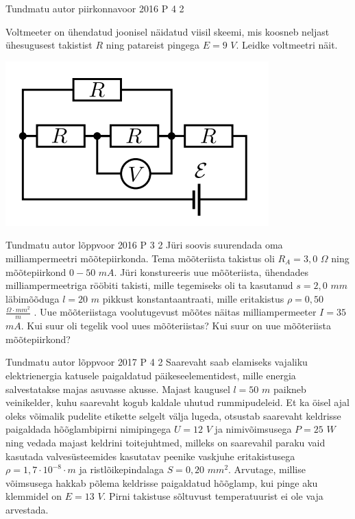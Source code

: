 \documentclass[11pt]{article}
\begin{document}
{%
{Tundmatu autor} %
{piirkonnavoor} %
{2016} %
{P 4} %
{2} %
{
\ifStatement
Voltmeeter on ühendatud joonisel näidatud viisil skeemi, mis koosneb neljast ühesugusest takistist $R$ ning patareist pingega $E = 9$ $V$. Leidke voltmeetri näit.
\begin{center}
	\includegraphics[width=0.5\linewidth]{2016-v2p-04-yl.png}
\end{center}
\fi
}


{Tundmatu autor} %
{lõppvoor} %
{2016} %
{P 3} %
{2} %
{
\ifStatement
Jüri soovis suurendada oma milliampermeetri mõõtepiirkonda. Tema mõõteriista takistus oli $R_A = 3,0$ $\Omega$ ning mõõtepiirkond $0 - 50$ $mA$. Jüri konstureeris uue mõõteriista, ühendades milliampermeetriga rööbiti takisti, mille tegemiseks oli ta kasutanud $s = 2,0$ $mm$ läbimõõduga $l = 20$ $m$ pikkust konstantaantraati, mille eritakistus $\rho = 0,50$ $\frac{\Omega \cdot mm^2}{m}$ . Uue mõõteriistaga voolutugevust mõõtes näitas milliampermeeter $I = 35$ $mA$. Kui suur oli tegelik vool uues mõõteriistas? Kui suur on uue mõõteriista mõõtepiirkond?
\fi
}

{Tundmatu autor} %
{lõppvoor} %
{2017} %
{P 4} %
{2} %
{
\ifStatement
Saarevaht saab elamiseks vajaliku elektrienergia katusele paigaldatud päikeseelementidest, mille energia salvestatakse majas asuvasse akusse. Majast kaugusel $l = 50$ $m$ paikneb veinikelder, kuhu saarevaht kogub kaldale uhutud rummipudeleid. Et ka öisel ajal oleks võimalik pudelite etikette selgelt välja lugeda, otsustab saarevaht keldrisse paigaldada hõõglambipirni nimipingega $U = 12$ $V$ ja nimivõimsusega $P = 25$ $W$ ning vedada majast keldrini toitejuhtmed, milleks on saarevahil paraku vaid kasutada valvesüsteemides kasutatav peenike vaskjuhe eritakistusega $\rho = 1,7 \cdot 10^{-8} \cdot m$ ja ristlõikepindalaga $S = 0,20$ $mm^2$. Arvutage, millise võimsusega hakkab põlema keldrisse paigaldatud hõõglamp, kui pinge aku klemmidel on $E = 13$ $V$. Pirni takistuse sõltuvust temperatuurist ei ole vaja arvestada. 
\fi
}

}
\end{document}
